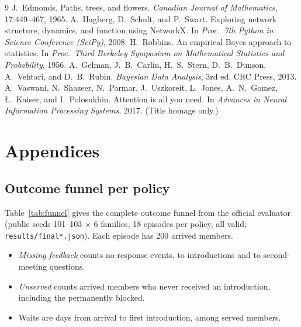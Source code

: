 \documentclass[10pt]{article}
\begin{document}
\begin{thebibliography}{9}\small
{} J.~Edmonds. Paths, trees, and flowers. \emph{Canadian Journal of Mathematics}, 17:449--467, 1965.
 A.~Hagberg, D.~Schult, and P.~Swart. Exploring network structure, dynamics, and function using NetworkX. In \emph{Proc.\ 7th Python in Science Conference (SciPy)}, 2008.
 H.~Robbins. An empirical Bayes approach to statistics. In \emph{Proc.\ Third Berkeley Symposium on Mathematical Statistics and Probability}, 1956.
 A.~Gelman, J.~B.~Carlin, H.~S.~Stern, D.~B.~Dunson, A.~Vehtari, and D.~B.~Rubin. \emph{Bayesian Data Analysis}, 3rd ed. CRC Press, 2013.
 A.~Vaswani, N.~Shazeer, N.~Parmar, J.~Uszkoreit, L.~Jones, A.~N.~Gomez, {\L}.~Kaiser, and I.~Polosukhin. Attention is all you need. In \emph{Advances in Neural Information Processing Systems}, 2017. (Title homage only.)
\end{thebibliography}

\clearpage
\appendix
\section*{Appendices}
\renewcommand{\thesubsection}{\Alph{subsection}}

\subsection{Outcome funnel per policy}\label{app:funnel}

Table~\ref{tab:funnel} gives the complete outcome funnel from the official evaluator (public seeds 101--103 $\times$ 6 families, 18 episodes per policy, all valid; \texttt{results/final*.json}). Each episode has 200 arrived members.

\begin{itemize}
\item \emph{Missing feedback} counts no-response events, to introductions and to second-meeting questions.
\item \emph{Unserved} counts arrived members who never received an introduction, including the permanently blocked.
\item Waits are days from arrival to first introduction, among served members.
\end{itemize}
\end{document}
